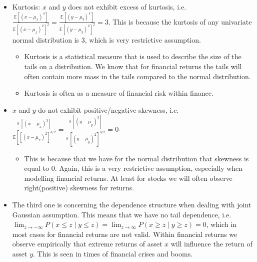 \documentclass{article}
\begin{document}
\begin{itemize}
    \item Kurtosis: $x$ and $y$ does not exhibit excess of kurtosis, i.e. $\frac{\mathbb{E}\left[\left(x-\mu_{x}\right)^{4}\right]}{\mathbb{E}\left[\left(x-\mu_{x}\right)^{2}\right]^{2}}=\frac{\mathbb{E}\left[\left(y-\mu_{3}\right)^{4}\right]}{\mathbb{E}\left[\left(y-\mu_{3}\right)^{2}\right]^{2}}=3$. This is because the kurtosis of any univariate normal distribution is 3, which is very restrictive assumption. 
    
    \begin{itemize}
        \item Kurtosis is a statistical measure that is used to describe the size of the tails on a distribution. We know that for financial returns the tails will often contain more mass in the tails compared to the normal distribution. 
        \item Kurtosis is often as a measure of financial risk within finance.
    \end{itemize}
    
    \item $x$ and $y$ do not exhibit positive/negative skewness, i.e. $\frac{\mathbb{E}\left[\left(x-\mu_{x}\right)^{3}\right]}{\mathbb{E}\left[\left[\left(x-\mu_{x}\right)^{2}\right]^{3 / 2}\right.}=\frac{\mathbb{E}\left[\left(y-\mu_{y}\right)^{3}\right]}{\mathbb{E}\left[\left(y-\mu_{y}\right)^{2}\right]^{3 / 2}}=0$. 
    
    \begin{itemize}
        \item This is because that we have for the normal distribution that skewness is equal to $0$. Again, this is a very restrictive assumption, especially when modelling financial returns. At least for stocks we will often observe right(positive) skewness for returns. 
    \end{itemize}
    
    \item The third one is concerning the dependence structure when dealing with joint Gaussian assumption. This means that we have no tail dependence, i.e. $\lim _{z \rightarrow-\infty} P(x \leq z \mid y \leq z)=\lim _{z \rightarrow \infty} P(x \geq z \mid y \geq z)=0$, which in most cases for financial returns are not valid. Within financial returns we observe empirically that extreme returns of asset $x$ will influence the return of asset $y$. This is seen in times of financial crises and booms.
    
\end{itemize}
\end{document}
